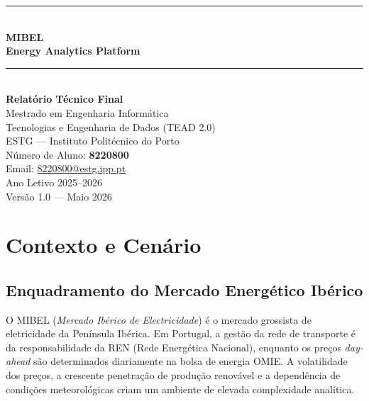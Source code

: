 \documentclass[11pt,a4paper]{article}
\begin{document}

\begin{titlepage}
  \centering
  \vspace*{2cm}
  {\color{mibel-blue}\rule{\linewidth}{1.5pt}}\\[0.4cm]
  {\Huge\bfseries\color{mibel-blue} MIBEL\\[0.3cm]
   \Large Energy Analytics Platform}\\[0.3cm]
  {\color{mibel-blue}\rule{\linewidth}{1.5pt}}\\[1.5cm]
  {\large\textbf{Relatório Técnico Final}}\\[0.5cm]
  {\large Mestrado em Engenharia Informática}\\
  {\large Tecnologias e Engenharia de Dados (TEAD 2.0)}\\[0.5cm]
  {\large ESTG --- Instituto Politécnico do Porto}\\[1.5cm]
  {\large Número de Aluno: \textbf{8220800}}\\[0.3cm]
  {\large Email: \href{mailto:8220800@estg.ipp.pt}{8220800@estg.ipp.pt}}\\[2cm]
  {\large Ano Letivo 2025--2026}\\[1cm]
  \vfill
  {\small Versão 1.0 --- Maio 2026}
\end{titlepage}

\tableofcontents
\newpage

\section{Contexto e Cenário}

\subsection{Enquadramento do Mercado Energético Ibérico}

O MIBEL (\textit{Mercado Ibérico de Electricidade}) é o mercado grossista de eletricidade da Península Ibérica. Em Portugal, a gestão da rede de transporte é da responsabilidade da REN (Rede Energética Nacional), enquanto os preços \textit{day-ahead} são determinados diariamente na bolsa de energia OMIE. A volatilidade dos preços, a crescente penetração de produção renovável e a dependência de condições meteorológicas criam um ambiente de elevada complexidade analítica.
\end{document}
